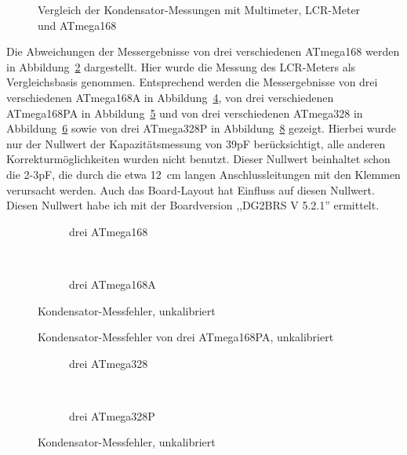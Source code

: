 \begin{figure}[H]
\centering

\caption{Vergleich der Kondensator-Messungen mit Multimeter, LCR-Meter und ATmega168}
\label{fig:capcompare}
\end{figure}

Die Abweichungen der Messergebnisse von drei verschiedenen ATmega168 werden in Abbildung~\ref{fig:mega168all} dargestellt.
Hier wurde die Messung des LCR-Meters als Vergleichsbasis genommen.
Entsprechend werden die Messergebnisse von drei verschiedenen ATmega168A in Abbildung~\ref{fig:mega168Aall}, 
von drei verschiedenen ATmega168PA in Abbildung~\ref{fig:mega168PAall} und von drei verschiedenen
ATmega328 in Abbildung~\ref{fig:mega328all} sowie von drei ATmega328P in Abbildung~\ref{fig:mega328Pall} gezeigt.
Hierbei wurde nur der Nullwert der Kapazitätsmessung von 39pF berücksichtigt, alle anderen Korrekturmöglichkeiten wurden
nicht benutzt. Dieser Nullwert beinhaltet schon die 2-3pF, die durch die etwa 12~cm langen Anschlussleitungen mit den
Klemmen verursacht werden.
Auch das Board-Layout hat Einfluss auf diesen Nullwert. Diesen Nullwert habe ich mit der Boardversion ,,DG2BRS V 5.2.1'' ermittelt.

\begin{figure}[H]
  \begin{subfigure}[b]{9cm}
    \centering
    \resizebox{9cm}{!}{}
    \caption{drei ATmega168}
    \label{fig:mega168all}
  \end{subfigure}
  ~
  \begin{subfigure}[b]{9cm}
    \centering
    \resizebox{9cm}{!}{}
    \caption{drei ATmega168A}
    \label{fig:mega168Aall}
  \end{subfigure}
  \caption{Kondensator-Messfehler, unkalibriert}
\end{figure}

\begin{figure}[H]
\centering

\caption{Kondensator-Messfehler von drei ATmega168PA, unkalibriert}
\label{fig:mega168PAall}
\end{figure}

\begin{figure}[H]
  \begin{subfigure}[b]{9cm}
    \centering
    \resizebox{9cm}{!}{}
    \caption{drei ATmega328}
    \label{fig:mega328all}
  \end{subfigure}
  ~
  \begin{subfigure}[b]{9cm}
    \centering
    \resizebox{9cm}{!}{}
    \caption{drei ATmega328P}
    \label{fig:mega328Pall}
  \end{subfigure}
  \caption{Kondensator-Messfehler, unkalibriert}
\end{figure}

